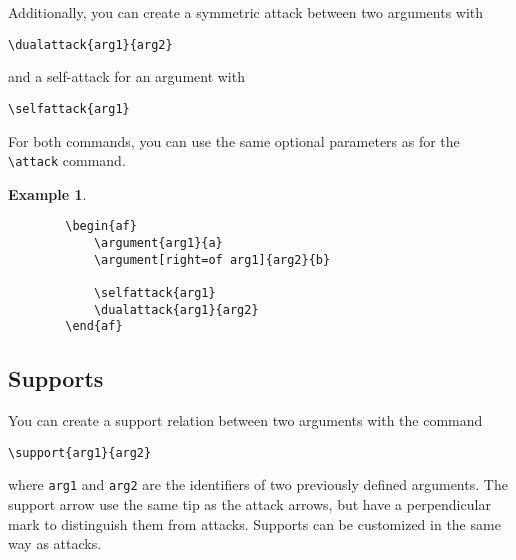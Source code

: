 \documentclass{article}
\newtheorem{example}{Example}
\begin{document}
    Additionally, you can create a symmetric attack between two arguments with

    \verb|\dualattack{arg1}{arg2}|

    \noindent
    and a self-attack for an argument with

    \verb|\selfattack{arg1}|

    \noindent
    For both commands, you can use the same optional parameters as for the \verb|\attack| command.

    \begin{example}~
    \begin{verbatim}
        \begin{af}
            \argument{arg1}{a}
            \argument[right=of arg1]{arg2}{b}
    
            \selfattack{arg1}
            \dualattack{arg1}{arg2}
        \end{af}    
    \end{verbatim}

    \begin{center}
        \begin{af}
    
        \end{af}
    \end{center}
    \end{example}
    

\subsection{Supports}
    You can create a support relation between two arguments with the command

    \verb|\support{arg1}{arg2}|

    \noindent
    where \verb|arg1| and \verb|arg2| are the identifiers of two previously defined arguments.
    The support arrow use the same tip as the attack arrows, but have a perpendicular mark to distinguish them from attacks.
    Supports can be customized in the same way as attacks.
\end{document}
